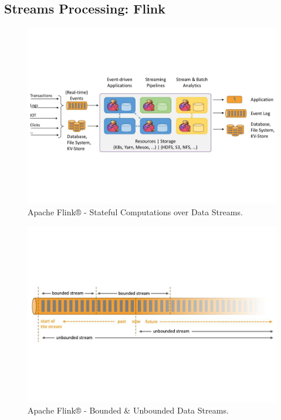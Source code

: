 \subsection{Streams Processing: Flink}\label{sec:flink}
\begin{figure}
	\centering
	\includegraphics[width=\columnwidth]{Images/apache_flink.pdf}
	\caption[Apache Flink® - Stateful Computations over Data Streams.]{Apache Flink® - Stateful Computations over Data Streams.}
	\label{fig:apache_flink}
\end{figure}
\begin{figure}
	\centering
	\includegraphics[width=\columnwidth]{Images/apache_flink_data_streams.pdf}
	\caption[Apache Flink® - Bounded \& Unbounded Data Streams.]{Apache Flink® - Bounded \& Unbounded Data Streams.}
	\label{fig:apache_flink_data_streams}
\end{figure}

